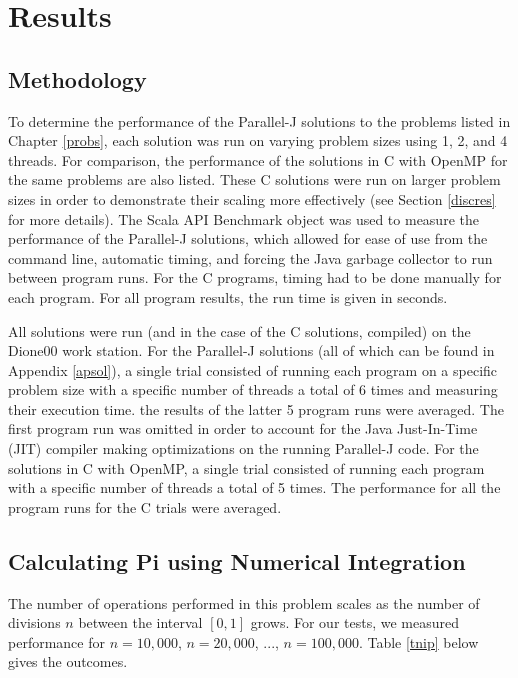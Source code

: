 \chapter{Results}
\label{res}

\section{Methodology}
To determine the performance of the Parallel-J solutions to the problems listed in Chapter \ref{probs}, 
each solution was run on varying problem sizes using 1, 2, and 4 threads. 
For comparison, the performance of the solutions in 
C with OpenMP for the same problems are also listed. 
These C solutions were run on larger problem sizes 
in order to demonstrate their scaling more effectively 
(see Section \ref{discres} for more details).
The Scala API Benchmark object was used to measure the performance of the Parallel-J solutions, 
which allowed for ease of use from the command line, automatic timing, 
and forcing the Java garbage collector to run between program runs. 
For the C programs, timing had to be done manually for each program. 
For all program results, the run time is given in seconds.

All solutions were run (and in the case of the C solutions, compiled) on the Dione00 work station. %
For the Parallel-J solutions (all of which can be found in Appendix \ref{apsol}), %
a single trial consisted of running each program 
on a specific problem size with a specific number of threads 
a total of 6 times and measuring their execution time. 
the results of the latter 5 program runs were averaged. 
The first program run was omitted in order to account for 
the Java Just-In-Time (JIT) compiler making optimizations on the running Parallel-J code.
For the solutions in C with OpenMP,
a single trial consisted of running each program with a specific number of threads a total of 5 times. 
The performance for all the program runs for the C trials were averaged.

\section{Calculating Pi using Numerical Integration}
\label{respi}
The number of operations performed in this problem scales 
as the number of divisions $n$ between the interval $[0,1]$ grows. 
For our tests, we measured performance for $n=10,000$, $n=20,000$, ..., $n=100,000$.
Table \ref{tnip} below gives the outcomes.

